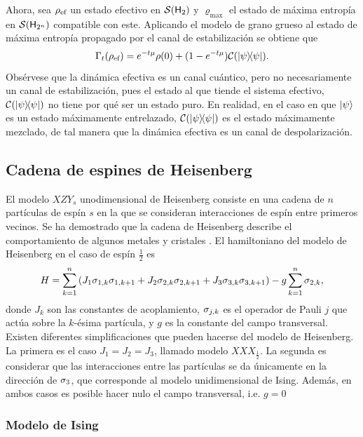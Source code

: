 Ahora, sea $\rho_{\text{ef}}$ un estado efectivo en $\mathcal{S}({\sf H}_{2})$ y $\varrho_{\max}$ el estado de máxima entropía en $\mathcal{S}({\sf H}_{2^{n}})$ compatible con este. Aplicando el modelo de grano grueso al estado de máxima entropía propagado por el canal de estabilización se obtiene que
\begin{equation}\label{eq:EffectiveStabilizing}
    \Gamma_{t}(\rho_{\ef})=e^{-t\mu}\rho(0)+(1-e^{-t \mu})\mcC(\dyad{\psi}).\nonumber
\end{equation}
Obsérvese que la dinámica efectiva es un canal cuántico, pero no necesariamente un canal de estabilización, pues el estado al que tiende el sistema efectivo, $\mcC(\dyad{\psi})$ no tiene por qué ser un estado puro. En realidad, en el caso en que $\ket{\psi}$ es un estado máximamente entrelazado, $\mcC(\dyad{\psi})$ es el estado máximamente mezclado, de tal manera que la dinámica efectiva es un canal de despolarización.

\subsection{Cadena de espines de Heisenberg}
El modelo $XZY_{s}$ unodimensional de Heisenberg consiste en una cadena de $n$ partículas de espín $s$ en la que se consideran interacciones de espín entre primeros vecinos. Se ha demostrado que la cadena de Heisenberg describe el comportamiento de algunos metales y cristales . El hamiltoniano del modelo de Heisenberg en el caso de espín $\frac{1}{2}$ es
\begin{equation}
    H=\sum_{k=1}^{n}\qty(J_{1}\sigma_{1,k}\sigma_{1,k+1}+J_{2}\sigma_{2,k}\sigma_{2,k+1}+J_{3}\sigma_{3,k}\sigma_{3,k+1})-g\sum_{k=1}^{n}\sigma_{2,k},
\end{equation}
donde $J_{k}$ son las constantes de acoplamiento, $\sigma_{j,k}$ es el operador de Pauli $j$ que actúa sobre la $k$-ésima partícula, y $g$ es la constante del campo transversal. Existen diferentes simplificaciones que pueden hacerse del modelo de Heisenberg. La primera es el caso $J_{1}=J_{2}=J_{3}$, llamado modelo $XXX_{\frac{1}{2}}$. La segunda es considerar que las interacciones entre las partículas se da únicamente en la dirección de $\sigma_{3}$, que corresponde al modelo unidimensional de Ising. Además, en ambos casos es posible hacer nulo el campo transversal, i.e. $g=0$

\subsubsection{Modelo de Ising}

